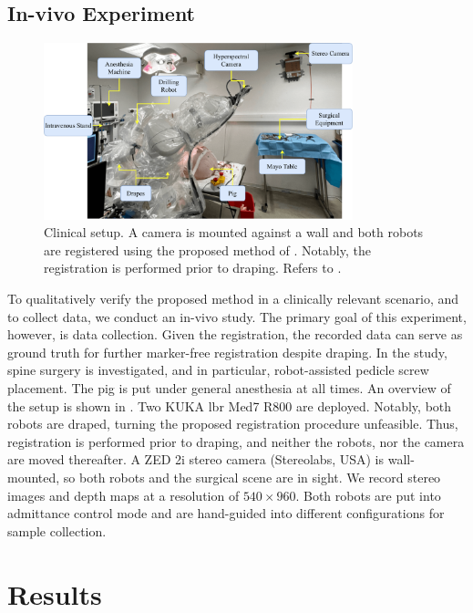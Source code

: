 \subsection{In-vivo Experiment}
\label{c1:sec:in_vivo_experiments}
\begin{figure}[tb]
    \centering
    \includegraphics[width=0.8\textwidth]{chapter_1/img/in_vivo_setup.pdf}
    \caption{Clinical setup. A camera is mounted against a wall and both robots are registered using the proposed method of . Notably, the registration is performed prior to draping. Refers to .}
    \label{c1:fig:in_vivo_setup}
\end{figure}
To qualitatively verify the proposed method in a clinically relevant scenario, and to collect data, we conduct an in-vivo study. The primary goal of this experiment, however, is data collection. Given the registration, the recorded data can serve as ground truth for further marker-free registration despite draping. In the study, spine surgery is investigated, and in particular, robot-assisted pedicle screw placement. The pig is put under general anesthesia at all times. An overview of the setup is shown in . Two KUKA \gls{lbr} Med7 R800 are deployed. Notably, both robots are draped, turning the proposed registration procedure unfeasible. Thus, registration is performed prior to draping, and neither the robots, nor the camera are moved thereafter. A ZED 2i stereo camera (Stereolabs, USA) is wall-mounted, so both robots and the surgical scene are in sight. We record stereo images and depth maps at a resolution of $540 \times 960$. Both robots are put into admittance control mode and are hand-guided into different configurations for sample collection.

\section{Results}
\label{c1:sec:results}

